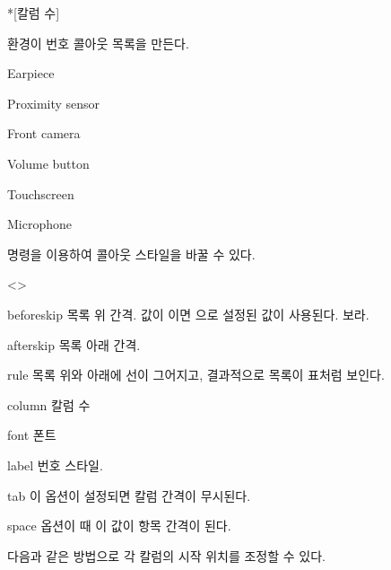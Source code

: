 \documentclass[pairquote, minted]{hzguide}
\begin{document}
\begin{code}
\begin{callout}*[칼럼 수] \item \end{callout}
\end{code}

 환경이 번호 콜아웃 목록을 만든다.

\begin{coderesult}
\begin{callout}
\item Earpiece
\item Proximity sensor
\item Front camera
\item Volume button
\item Touchscreen
\item Microphone
\end{callout}
\end{coderesult}

\macro{\CalloutSetup} 명령을 이용하여 콜아웃 스타일을 바꿀 수 있다.

\begin{macros}<\CalloutSetup>
\item[beforeskip] \keyvalue{\hznulldim, 0.5\onelineskip}
목록 위 간격. 값이 
\macro{\hznulldim}이면 \macro{\ObjectSetup}으로 설정된 값이 사용된다.
\를 보라.

\item[afterskip] \keyvalue{\hznulldim, 0.5\onelineskip}
목록 아래 간격. 

\item[rule] \keyvalueTF
목록 위와 아래에 선이 그어지고, 결과적으로 목록이 표처럼 보인다.

\item[column] 
칼럼 수

\item[font] \keyvalue{\small}
폰트

\item[label] \keyvalue{\makebox[1.25em]{\hfill\calloutno)}\enspace}
번호 스타일. 

\item[tab] \keyvalueTF
이 옵션이  설정되면 칼럼 간격이 무시된다.

\item[space] \keyvalue{0.25em}
 옵션이  때 이 값이 항목 간격이 된다.
\end{macros}


다음과 같은 방법으로 각 칼럼의 시작 위치를 조정할 수 있다.
\end{document}
